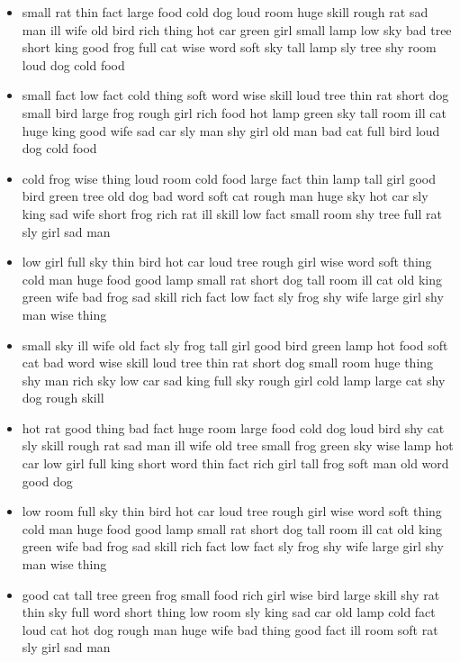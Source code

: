 \documentclass[11pt,a4wide]{article}
\begin{document}
\begin{itemize}
  \item small rat thin fact large food cold dog loud room huge skill
    rough rat sad man ill wife old bird rich thing hot car green girl
    small lamp low sky bad tree short king good frog full cat wise
    word soft sky tall lamp sly tree shy room loud dog cold food

  \item small fact low fact cold thing soft word wise skill loud tree
    thin rat short dog small bird large frog rough girl rich food hot
    lamp green sky tall room ill cat huge king good wife sad car sly
    man shy girl old man bad cat full bird loud dog cold food

  \item cold frog wise thing loud room cold food large fact thin lamp
    tall girl good bird green tree old dog bad word soft cat rough man
    huge sky hot car sly king sad wife short frog rich rat ill skill
    low fact small room shy tree full rat sly girl sad man

  \item low girl full sky thin bird hot car loud tree rough girl wise
    word soft thing cold man huge food good lamp small rat short dog
    tall room ill cat old king green wife bad frog sad skill rich fact
    low fact sly frog shy wife large girl shy man wise thing

  \item small sky ill wife old fact sly frog tall girl good bird green
    lamp hot food soft cat bad word wise skill loud tree thin rat
    short dog small room huge thing shy man rich sky low car sad king
    full sky rough girl cold lamp large cat shy dog rough skill

  \item hot rat good thing bad fact huge room large food cold dog loud
    bird shy cat sly skill rough rat sad man ill wife old tree small
    frog green sky wise lamp hot car low girl full king short word
    thin fact rich girl tall frog soft man old word good dog

  \item low room full sky thin bird hot car loud tree rough girl wise
    word soft thing cold man huge food good lamp small rat short dog
    tall room ill cat old king green wife bad frog sad skill rich fact
    low fact sly frog shy wife large girl shy man wise thing

  \item good cat tall tree green frog small food rich girl wise bird
    large skill shy rat thin sky full word short thing low room sly
    king sad car old lamp cold fact loud cat hot dog rough man huge
    wife bad thing good fact ill room soft rat sly girl sad man


\end{itemize}
\end{document}
